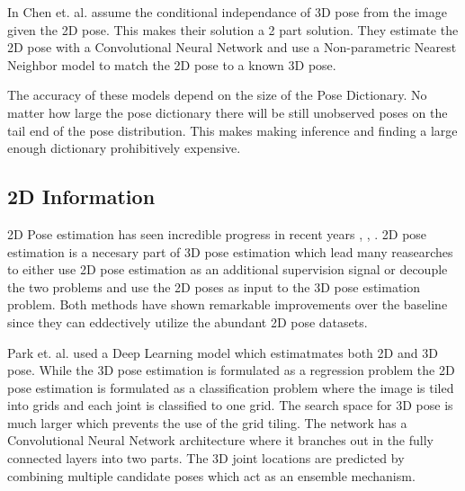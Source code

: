 In \parencite{chen20173d} Chen et. al. assume the conditional independance of 3D pose from the image given the 2D pose. This makes their solution a 2 part solution. They estimate the 2D pose with a Convolutional Neural Network and use a Non-parametric Nearest Neighbor model to match the 2D pose to a known 3D pose. 

The accuracy of these models depend on the size of the Pose Dictionary. No matter how large the pose dictionary there will be still unobserved poses on the tail end of the pose distribution. This makes making inference and finding a large enough dictionary prohibitively expensive.

\subsection{2D Information}

2D Pose estimation has seen incredible progress in recent years \parencite{cao2016realtime}, \parencite{newell2016stacked}, \parencite{iqbal2017posetrack}. 2D pose estimation is a necesary part of 3D pose estimation which lead many reasearches to either use 2D pose estimation as an additional supervision signal or decouple the two problems and use the 2D poses as input to the 3D pose estimation problem. Both methods have shown remarkable improvements over the baseline since they can eddectively utilize the abundant 2D pose datasets. 

Park et. al. \parencite{park20163d} used a Deep Learning model which estimatmates both 2D and 3D pose. While the 3D pose estimation is formulated as a regression problem the 2D pose estimation is formulated as a classification problem where the image is tiled into grids and each joint is classified to one grid. The search space for 3D pose is much larger which prevents the use of the grid tiling. The network has a Convolutional Neural Network architecture where it branches out in the fully connected layers into two parts. The 3D joint locations are predicted by combining multiple candidate poses which act as an ensemble mechanism.

